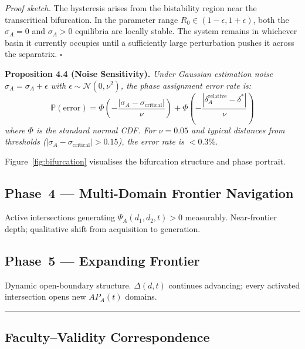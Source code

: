 \documentclass[10pt]{article}
\begin{document}
\textit{Proof sketch.} The hysteresis arises from the bistability region
near the transcritical bifurcation. In the parameter range
$R_0 \in (1 - \epsilon, 1 + \epsilon)$, both the $\sigma_A = 0$ and
$\sigma_A > 0$ equilibria are locally stable. The system remains in
whichever basin it currently occupies until a sufficiently large
perturbation pushes it across the separatrix. $\square$

\textbf{Proposition 4.4 (Noise Sensitivity).} %
\textit{Under Gaussian estimation noise $\hat{\sigma}_A = \sigma_A + \epsilon$
with $\epsilon \sim \mathcal{N}(0, \nu^2)$, the phase assignment error rate is:
\begin{equation}\label{eq:phase-error-rate}
\mathbb{P}(\text{error}) = \Phi\!\left(-\frac{|\sigma_A - \sigma_{\text{critical}}|}{\nu}\right) + \Phi\!\left(-\frac{|\delta_A^{\text{relative}} - \delta^*|}{\nu}\right)
\end{equation}
where $\Phi$ is the standard normal CDF. For $\nu = 0.05$ and typical
distances from thresholds ($|\sigma_A - \sigma_{\text{critical}}| > 0.15$),
the error rate is $< 0.3\%$.}



Figure~\ref{fig:bifurcation} visualises the bifurcation structure and phase portrait.

\subsection*{Phase~4 --- Multi-Domain Frontier Navigation}

Active intersections generating $\Psi_A(d_1,d_2,t) > 0$ measurably.
Near-frontier depth; qualitative shift from acquisition to generation.

\subsection*{Phase~5 --- Expanding Frontier}

Dynamic open-boundary structure. $\Delta(d,t)$ continues advancing;
every activated intersection opens new $AP_A(t)$ domains.

\noindent\rule{\linewidth}{0.4pt}

\subsection{Faculty--Validity Correspondence}\label{sec:faculty-validity}
\end{document}
